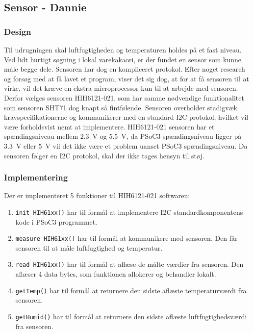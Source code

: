 \subsection{Sensor - Dannie} \label{Sensor}

\subsubsection{Design}

Til udrugningen skal luftfugtigheden og temperaturen holdes på et fast niveau. 
Ved lidt hurtigt søgning i lokal varekakaori, er der fundet en sensor som kunne måle begge dele. Sensoren har dog en kompliceret protokol. Efter noget research og forsøg med at få lavet et program, viser det sig dog, at for at få sensoren til at virke, vil det kræve en ekstra microprocessor kun til at arbejde med sensoren. Derfor vælges sensoren HIH6121-021, som har samme nødvendige funktionalitet som sensoren SHT71 dog knapt så fintfølende. Sensoren overholder stadigvæk kravspecifikationerne og kommunikerer med en standard I2C protokol, hvilket vil være forholdsvist nemt at implementere. HIH6121-021 sensoren har et spændingsniveau mellem \SI{2.3}{\volt} og \SI{5.5}{\volt}\cite{HIH61xx}, da PSoC3 spændingsniveau ligger på \SI{3.3}{\volt} eller \SI{5}{\volt} vil det ikke være et problem uanset PSoC3 spændingsniveau. Da sensoren følger en I2C protokol\cite{HIH61xx_I2C}, skal der ikke tages hensyn til støj.

\subsubsection{Implementering}

Der er implementeret 5 funktioner til HIH6121-021 softwaren:
\begin{enumerate}
\item \texttt{init\_HIH61xx()} har til formål at implementere I2C standardkomponentens kode i PSoC3 programmet. 

\item \texttt{measure\_HIH61xx()} har til formål at kommunikere med sensoren. Den får sensoren til at måle luftfugtighed og temperatur.

\item \texttt{read\_HIH61xx()} har til formål at aflæse de målte værdier fra sensoren. Den aflæser 4 data bytes, som funktionen allokerer og behandler lokalt. 

\item \texttt{getTemp()} har til formål at returnere den sidste aflæste temperaturværdi fra sensoren. 

\item \texttt{getHumid()} har til formål at returnere den sidste aflæste luftfugtighedsværdi fra sensoren.
\end{enumerate}

